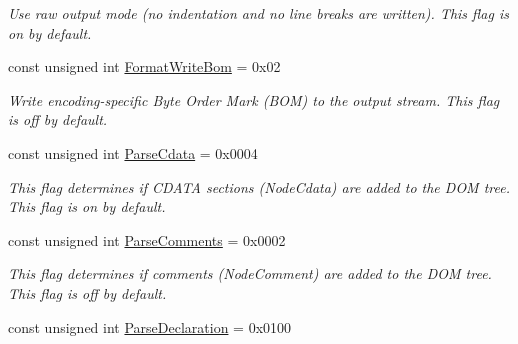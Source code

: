 \begin{DoxyCompactItemize}
\begin{DoxyCompactList}\small\item\em Use raw output mode (no indentation and no line breaks are written). This flag is on by default. \item\end{DoxyCompactList}\item 
\hypertarget{namespacephys_1_1xml_a76a253f60deb94ef39c255064afb6040}{
const unsigned int \hyperlink{namespacephys_1_1xml_a76a253f60deb94ef39c255064afb6040}{FormatWriteBom} = 0x02}
\label{namespacephys_1_1xml_a76a253f60deb94ef39c255064afb6040}

\begin{DoxyCompactList}\small\item\em Write encoding-\/specific Byte Order Mark (BOM) to the output stream. This flag is off by default. \item\end{DoxyCompactList}\item 
\hypertarget{namespacephys_1_1xml_aec00a2a16700dfd76f8f3c776bd000ac}{
const unsigned int \hyperlink{namespacephys_1_1xml_aec00a2a16700dfd76f8f3c776bd000ac}{ParseCdata} = 0x0004}
\label{namespacephys_1_1xml_aec00a2a16700dfd76f8f3c776bd000ac}

\begin{DoxyCompactList}\small\item\em This flag determines if CDATA sections (NodeCdata) are added to the DOM tree. This flag is on by default. \item\end{DoxyCompactList}\item 
\hypertarget{namespacephys_1_1xml_a83ba30a7bee5a0fd4aa2f6136c8793fc}{
const unsigned int \hyperlink{namespacephys_1_1xml_a83ba30a7bee5a0fd4aa2f6136c8793fc}{ParseComments} = 0x0002}
\label{namespacephys_1_1xml_a83ba30a7bee5a0fd4aa2f6136c8793fc}

\begin{DoxyCompactList}\small\item\em This flag determines if comments (NodeComment) are added to the DOM tree. This flag is off by default. \item\end{DoxyCompactList}\item 
\hypertarget{namespacephys_1_1xml_a463f15fc43d69ab835c8598826f65646}{
const unsigned int \hyperlink{namespacephys_1_1xml_a463f15fc43d69ab835c8598826f65646}{ParseDeclaration} = 0x0100}
\label{namespacephys_1_1xml_a463f15fc43d69ab835c8598826f65646}


\end{DoxyCompactItemize}
